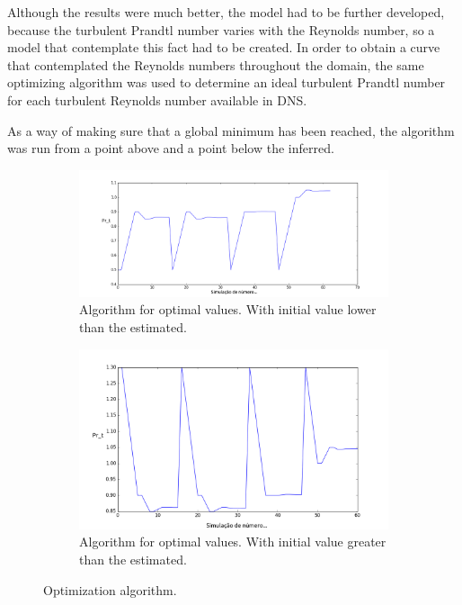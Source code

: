 \documentclass[10pt]{article} %
\begin{document}
Although the results were much better, the model had to be further developed, because the turbulent Prandtl number varies with the Reynolds number, so a model that contemplate this fact had to be created. 
In order to obtain a curve that contemplated the Reynolds numbers throughout the domain, the same optimizing algorithm was used to determine an ideal turbulent Prandtl number for each turbulent Reynolds number available in DNS.

As a way of making sure that a global minimum has been reached, the algorithm was run from a point above and a point below the inferred.	\\

\begin{figure}[!h]
	\centering
	\begin{subfigure}[t]{0.49\textwidth}
		\centering
		\includegraphics[angle=0, scale=0.19]{convergnciacima}
		\caption{Algorithm for optimal values. With initial value lower than the estimated.}
	\end{subfigure}
	\begin{subfigure}[t]{0.49\textwidth}
		\centering
		\includegraphics[angle=0, scale=0.19]{convergnciabaixo}
		\caption{Algorithm for optimal values. With initial value greater than the estimated.}
	\end{subfigure}
\caption{Optimization algorithm.}
\end{figure}
\end{document}
